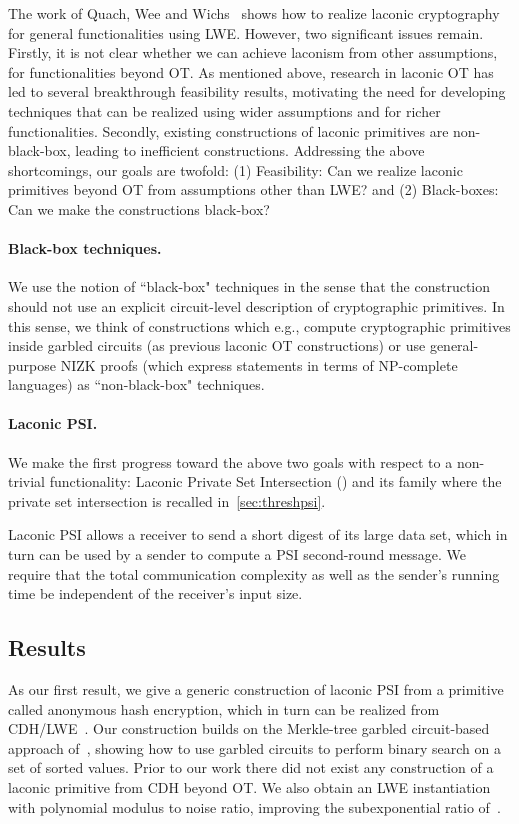 The work of Quach, Wee and Wichs~\cite{FOCS:QuaWeeWic18} shows how to realize laconic cryptography for general functionalities using LWE. However, two significant issues remain. Firstly, it is not clear whether we can achieve laconism from other assumptions, for functionalities beyond OT. As mentioned above, research in laconic OT has led to several breakthrough feasibility results, motivating the need for developing techniques that can be realized using wider assumptions and for richer functionalities. Secondly, existing constructions of laconic primitives are non-black-box, leading to inefficient constructions.  
Addressing the above shortcomings, our goals are twofold: (1) Feasibility: Can we realize laconic primitives beyond OT from assumptions other than LWE? and (2) Black-boxes: Can we make the constructions black-box? 

 
 
 \paragraph{Black-box techniques.} We use the notion of ``black-box" techniques in the sense that the construction should not use an explicit circuit-level description of cryptographic primitives. In this sense, we think of constructions which e.g., compute cryptographic primitives inside garbled circuits (as previous laconic OT constructions) or use general-purpose NIZK proofs (which express statements in terms of NP-complete languages) as ``non-black-box" techniques.

\paragraph{Laconic PSI.} We make the first progress toward the above two goals with respect to a non-trivial functionality: Laconic Private Set Intersection (\ePSI) and its family where the private set intersection is recalled in~\cref{sec:threshpsi}.

Laconic PSI allows a receiver to send a short digest of its large data set, which in turn can be used by a sender to compute a PSI  second-round message. We require  that the total communication complexity as well as the sender's running time be independent of the receiver's input size. 

 \subsection{Results}
As our first result, we give a generic construction of  laconic PSI from a primitive called anonymous hash encryption, which in turn can be realized from CDH/LWE~\cite{C:DotGar17,TCC:DotGar17,EC:BLSV18}. Our construction builds on the Merkle-tree garbled circuit-based approach of~\cite{C:DotGar17,TCC:DotGar17,EC:BLSV18,TCC:GHMR18,PKC:GHMRS19,C:GoyVus20}, showing how to use garbled circuits to perform  binary search on a set of sorted values. Prior to our work there did not exist any construction of a laconic primitive from CDH beyond OT. We also obtain an LWE instantiation with polynomial modulus to noise ratio, improving the subexponential ratio of~\cite{FOCS:QuaWeeWic18}.

